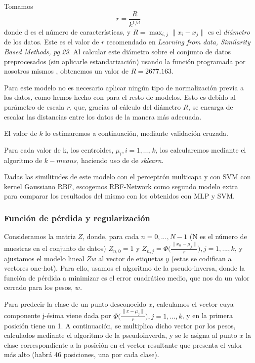 \documentclass[a4]{article}
\begin{document}
Tomamos $$r=\frac{R}{k^{1/d}}$$ donde d es el número de características, y $R=\max_{i,j}\|x_i-x_j\|$ es el \textit{diámetro} de los datos. Este es el valor de $r$ recomendado en \textit{Learning from data, Similarity Based Methods, pg.29}. Al calcular este diámetro sobre el conjunto de datos preprocesados (sin aplicarle estandarización) usando la función programada por nosotros mismos , obtenemos un valor de $R=2677.163$.

Para este modelo no es necesario aplicar ningún tipo de normalización previa a los datos, como hemos hecho con  para el resto de modelos. Esto es debido al parámetro de escala $r$, que, gracias al cálculo del diámetro $R$, se encarga de escalar las distancias entre los datos de la manera más adecuada.


El valor de $k$ lo estimaremos a continuación, mediante validación cruzada. 

Para cada valor de k, los centroides, $\mu_i, i=1,...,k$, los calcularemos mediante el algoritmo de $k-means$, haciendo uso de  de \textit{sklearn}.

Dadas las similitudes de este modelo con el perceptrón multicapa y con SVM con kernel Gaussiano RBF, escogemos RBF-Network como segundo modelo extra para comparar los resultados del mismo con los obtenidos con MLP y SVM. 

\subsubsection{Función de pérdida y regularización}

Consideramos la matriz $Z$, donde, para cada $n=0,...,N-1$ (N es el número de muestras en el conjunto de datos) $Z_{n,0}=1$ y $Z_{n,j}=\Phi\Big(\frac{\|x_n-\mu_j\|}{r}\Big), j= 1,...,k$, y ajustamos el modelo lineal $Zw$ al vector de etiquetas $y$ (estas se codifican a vectores one-hot). Para ello, usamos el algoritmo de la pseudo-inversa, donde la función de pérdida a minimizar es el error cuadrático medio, que nos da un valor cerrado para los pesos, $w$. 

Para predecir la clase de un punto desconocido $x$, calculamos el vector cuya componente j-ésima viene dada por  $\Phi\Big(\frac{\|x-\mu_j\|}{r}\Big), j = 1,...,k$, y en la primera posición tiene un 1. A continuación, se multiplica dicho vector por los pesos, calculados mediante el algoritmo de la pseudoinverda, y se le asigna al punto $x$ la clase correspondiente a la posición en el vector resultante que presenta el valor más alto (habrá 46 posiciones, una por cada clase). 
\end{document}
